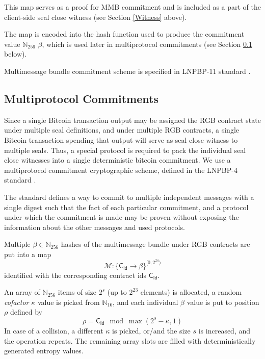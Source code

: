 \documentclass[9pt,oneside]{amsart}
\begin{document}
\begin{multicols}{2}
This map serves as a proof for MMB commitment and is included as a part of the
client-side seal close witness (see Section \ref{Witness} above).

The map is encoded into the hash function
used to produce the commitment value $\mathbb{N}_{256}$ $\beta$,
which is used later in multiprotocol commitments (see Section \ref{MPC} below).

Multimessage bundle commitment scheme is specified in LNPBP-11 standard \cite{LNPBP11}.

\subsection{Multiprotocol Commitments}\label{MPC}

Since a single Bitcoin transaction output may be assigned the RGB contract state
under multiple seal definitions, and under multiple RGB contracts,
a single Bitcoin transaction spending that output will serve as
\gls{seal close witness} to multiple seals.
Thus, a special protocol is required to pack the individual seal close witnesses
into a single deterministic bitcoin commitment.
We use a multiprotocol commitment cryptographic scheme, defined in the LNPBP-4
standard \cite{LNPBP4}.

The standard defines a way to commit to multiple independent messages
with a single digest such that the fact of each particular commitment,
and a protocol under which the commitment is made may be proven without
exposing the information about the other messages and used protocols.

Multiple $\beta \in \mathbb{N}_{256}$ hashes of the multimessage bundle under
RGB contracts are put into a map
\noindent
\begin{equation}
\mathcal{M}: \{ \mathsf{C_{Id}} \rightarrow \beta \}^{[0, 2^{24})}
\end{equation}
\noindent
identified with the corresponding contract ids $\mathsf{C_{Id}}$.

An array of $\mathbb{N}_{256}$ items of size $2^s$ (up to $2^23$ elements) is allocated,
a random \emph{cofactor} $\kappa$ value is picked from $\mathbb{N}_{16}$,
and each individual $\beta$ value is put to position $\rho$ defined by
\noindent
\begin{equation}
    \rho = \mathsf{C_{Id}} \mod \max(2^s - \kappa, 1)
\end{equation}
\noindent
In case of a collision, a different $\kappa$ is picked,
or/and the size $s$ is increased, and the operation repeats.
The remaining array slots are filled with deterministically generated entropy values.


\end{multicols}
\end{document}
